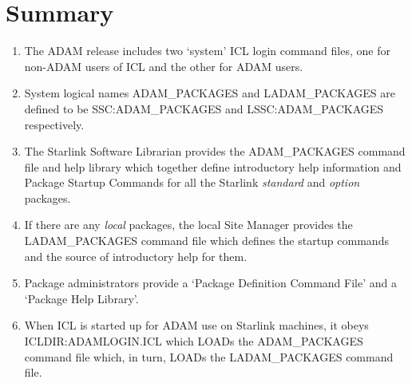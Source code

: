 \section{Summary}
\begin{enumerate}
\item The ADAM release includes two `system' ICL login command files,
one for non-ADAM users of ICL and the other for ADAM users.
\item System logical names ADAM\-\_PACKAGES and LADAM\-\_PACKAGES are defined
to be SSC:\-ADAM\-\_PACKAGES and LSSC:\-ADAM\-\_PACKAGES respectively.
\item The Starlink Software Librarian provides the ADAM\-\_PACKAGES command file
and help library which together define introductory help information and
Package Startup Commands for all the Starlink {\em standard} and
{\em option} packages.
\item If there are any {\em local} packages, the local Site Manager provides 
the LADAM\-\_PACKAGES command file which defines the startup commands and the
source of introductory help for them.
\item Package administrators provide a `Package Definition Command 
File' and a `Package Help Library'.
\item When ICL is started up for ADAM use on Starlink machines, it obeys
ICLDIR:\-ADAM\-LOGIN\-.ICL which LOADs the ADAM\-\_PACKAGES command file which,
in turn, LOADs the LADAM\-\_PACKAGES command file.
\end{enumerate}

